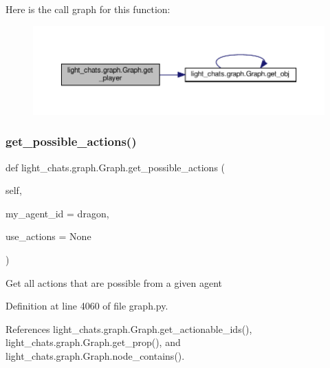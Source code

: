 Here is the call graph for this function\+:
\nopagebreak
\begin{figure}[H]
\begin{center}
\leavevmode
\includegraphics[width=350pt]{classlight__chats_1_1graph_1_1Graph_a7f86299224bed2c821ed4ffa853cd669_cgraph}
\end{center}
\end{figure}
\mbox{\label{classlight__chats_1_1graph_1_1Graph_a40e6753f63c9c8d31dd57a5c38aaac3c}} 
\subsubsection{\texorpdfstring{get\+\_\+possible\+\_\+actions()}{get\_possible\_actions()}}
{\footnotesize\ttfamily def light\+\_\+chats.\+graph.\+Graph.\+get\+\_\+possible\+\_\+actions (\begin{DoxyParamCaption}\item[{}]{self,  }\item[{}]{my\+\_\+agent\+\_\+id = {\ttfamily \textquotesingle{}dragon\textquotesingle{}},  }\item[{}]{use\+\_\+actions = {\ttfamily None} }\end{DoxyParamCaption})}

\begin{DoxyVerb}Get all actions that are possible from a given agent
\end{DoxyVerb}
 

Definition at line 4060 of file graph.\+py.



References light\+\_\+chats.\+graph.\+Graph.\+get\+\_\+actionable\+\_\+ids(), light\+\_\+chats.\+graph.\+Graph.\+get\+\_\+prop(), and light\+\_\+chats.\+graph.\+Graph.\+node\+\_\+contains().



